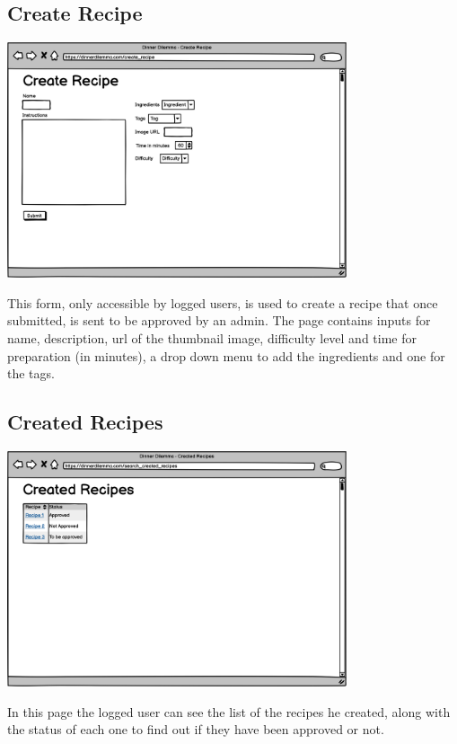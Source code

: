 \subsection{Create Recipe}
\includegraphics[width=0.75\textwidth]{images/createrecipe.png}

This form, only accessible by logged users, is used to create a recipe that once submitted, is sent to be approved by an admin. The page contains inputs for name, description, url of the thumbnail image, difficulty level and time for preparation (in minutes), a drop down menu to add the ingredients and one for the tags.

\subsection{Created Recipes}
\includegraphics[width=0.75\textwidth]{images/createdrecipes.png}

In this page the logged user can see the list of the recipes he created, along with the status of each one to find out if they have been approved or not. 

